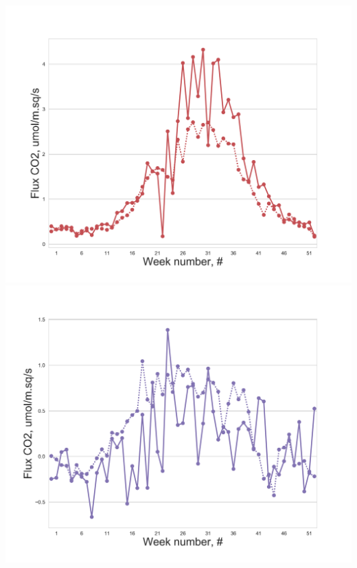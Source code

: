\documentclass{beamer}
\begin{document}
\begin{frame}
\begin{columns}[t]
\centering
\includegraphics[width=\textwidth]{F_ML_2/2.png}\\
\includegraphics[width=\textwidth]{F_ML_2/3.png}
\end{columns}
\end{frame}

\end{document}
